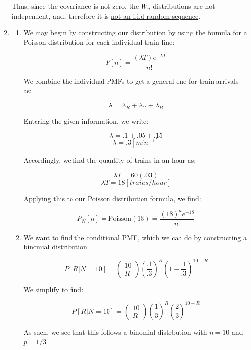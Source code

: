 \begin{enumerate}
    Thus, since the covariance is not zero, the $W_n$ distributions are not independent, and, therefore it is \underline{not an i.i.d random sequence}.

    \setcounter{enumi}{11}

  \item

    \begin{enumerate}

      \item We may begin by constructing our distribution by using the formula for a Poisson distribution for each individual train line:

        $$P[n]=\frac{(\lambda T)e^{-\lambda T}}{n!}$$

        We combine the individual PMFs to get a general one for train arrivals as:

        $$\lambda= \lambda_R+\lambda_G+\lambda_B$$

        Entering the given information, we write:

        $$\lambda= .1+.05+.15$$
        $$\lambda= .3[\si{min^{-1}}]$$

        Accordingly, we find the quantity of trains in an hour as:

        $$\lambda T=60(.03)$$
        $$\lambda T=18[\si{trains/hour}]$$

        Applying this to our Poisson distribution formula, we find:

        $$\boxed{P_N[n]=\text{Poisson}(18)=\frac{(18)^ne^{-18}}{n!}}$$

      \item We want to find the conditional PMF, which we can do by constructing a binomial distribution

        $$P[R|N=10]=\left( \begin{matrix} 10\\ R \end{matrix} \right)\left( \frac{.1}{.3} \right)^R\left( 1-\frac{.1}{.3} \right)^{10-R} $$

        We simplify to find:

        $$\boxed{P[R|N=10]=\left( \begin{matrix} 10\\ R \end{matrix} \right)\left( \frac{1}{3} \right)^R\left( \frac{2}{3} \right)^{10-R}}$$

        As such, we see that this follows a binomial distrbution with $n=10$ and $p=1/3$

    \end{enumerate}

\end{enumerate}



